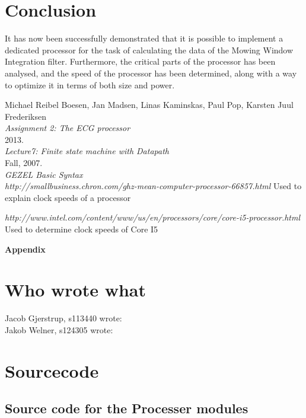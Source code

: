 \documentclass[12pt,a4paper]{article}
\begin{document}
\section{Conclusion}
It has now been successfully demonstrated that it is possible to implement a dedicated processor for the task of calculating the data of the Mowing Window Integration filter. Furthermore, the critical parts of the processor has been analysed, and the speed of the processor has been determined, along with a way to optimize it in terms of both size and power.
\newpage
\begin{thebibliography}{9}

  Michael Reibel Boesen, Jan Madsen, Linas Kaminskas, Paul Pop, Karsten Juul Frederiksen\\
  \emph{Assignment 2: The ECG processor}\\
  2013.\\

  \emph{Lecture7: Finite state machine with Datapath}\\
  Fall, 2007.\\

  \emph{GEZEL Basic Syntax}\\
  
  \emph{http://smallbusiness.chron.com/ghz-mean-computer-processor-66857.html}
  Used to explain clock speeds of a processor
  
  \emph{http://www.intel.com/content/www/us/en/processors/core/core-i5-processor.html}
  Used to determine clock speeds of Core I5
\end{thebibliography}
	
\newpage	
	\begin{Large}
		\textbf{Appendix}
	\end{Large}
	\appendix

\section{Who wrote what}
Jacob Gjerstrup, s113440 wrote: \\
Jakob Welner, s124305 wrote: \\

\section{Sourcecode}

\subsection{Source code for the Processer modules}
\end{document}
